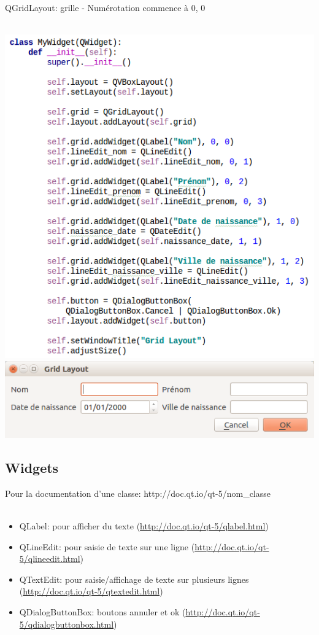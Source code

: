 \documentclass[9pt, french, brown]{beamer}
\newcommand{\mytitle}[1]{{\color{brown}#1 \\~\\}}
\begin{document}
\begin{frame}{\secname}{\subsecname}
\mytitle{QGridLayout: grille - Numérotation commence à 0, 0}
\begin{center}\includegraphics[scale=0.3]{img/widget6_1}\includegraphics[scale=0.3]{img/widget6_1_fig}\end{center}
\end{frame}

\subsection{Widgets}
\begin{frame}{\secname}{\subsecname}
Pour la documentation d\rq{}une classe: http://doc.qt.io/qt-5/nom\_classe\\
~\\
\begin{itemize}
\item QLabel: pour afficher du texte (\url{http://doc.qt.io/qt-5/qlabel.html})
\item QLineEdit: pour saisie de texte sur une ligne (\url{http://doc.qt.io/qt-5/qlineedit.html})
\item QTextEdit: pour saisie/affichage de texte sur plusieurs lignes (\url{http://doc.qt.io/qt-5/qtextedit.html})
\item QDialogButtonBox: boutons annuler et ok (\url{http://doc.qt.io/qt-5/qdialogbuttonbox.html})
\end{itemize}
\end{frame}
\end{document}
